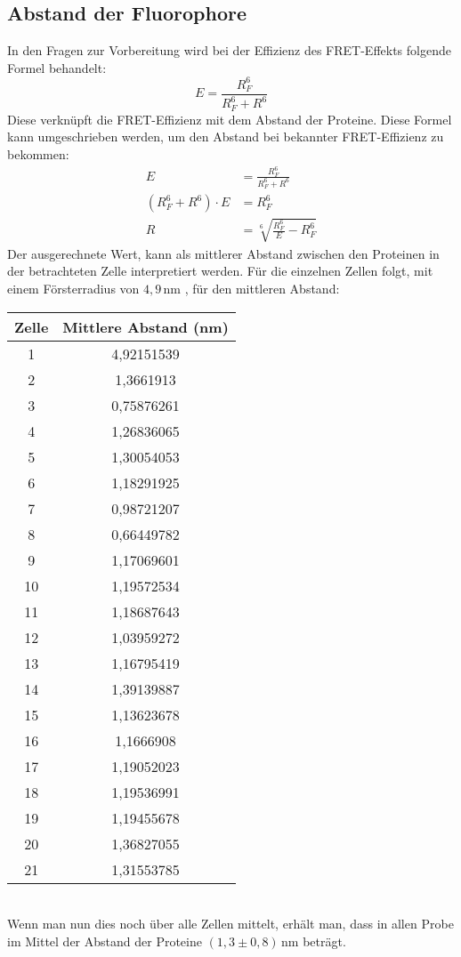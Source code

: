 \subsection{Abstand der Fluorophore}
In den Fragen zur Vorbereitung wird bei der Effizienz des FRET-Effekts folgende Formel behandelt:
\begin{equation}
    E=\frac{R_F^6}{R_F^6+R^6}
\end{equation}
Diese verknüpft die FRET-Effizienz mit dem Abstand der Proteine.
Diese Formel kann umgeschrieben werden, um den Abstand bei bekannter FRET-Effizienz zu bekommen:
\begin{align}
    E&=\frac{R_F^6}{R_F^6+R^6}\\
    \left(R_F^6+R^6\right)\cdot E&=R_F^6\\
    R&=\sqrt[6]{\frac{R_F^6}{E}-R_F^6}
\end{align}
Der ausgerechnete Wert, kann als mittlerer Abstand zwischen den Proteinen in der betrachteten Zelle interpretiert werden.\newpage
Für die einzelnen Zellen folgt, mit einem Försterradius von $4,9\,\text{nm}$ \citep[vgl.][]{foersterradius}, für den mittleren Abstand:
\begin{table}[htbp]
    \centering
      \begin{tabular}{c|c}
        Zelle & Mittlere Abstand (nm)\\\hline
      1 & 4,92151539 \\
      2 & 1,3661913 \\
      3 & 0,75876261 \\
      4 & 1,26836065 \\
      5 & 1,30054053 \\
      6 & 1,18291925 \\
      7 & 0,98721207 \\
      8 & 0,66449782 \\
      9 & 1,17069601 \\
      10 & 1,19572534 \\
      11 & 1,18687643 \\
      12 & 1,03959272 \\
      13 & 1,16795419 \\
      14 & 1,39139887 \\
      15 & 1,13623678 \\
      16 & 1,1666908 \\
      17 & 1,19052023 \\
      18 & 1,19536991 \\
      19 & 1,19455678 \\
      20 & 1,36827055 \\
      21 & 1,31553785 \\
      \end{tabular}
    \label{Mittlere Abstand der Proteine in den Zellen}
  \end{table}\\
Wenn man nun dies noch über alle Zellen mittelt, erhält man, dass in allen Probe im Mittel der Abstand der Proteine $\left(1,3\pm0,8\right)\,\text{nm}$ beträgt.
